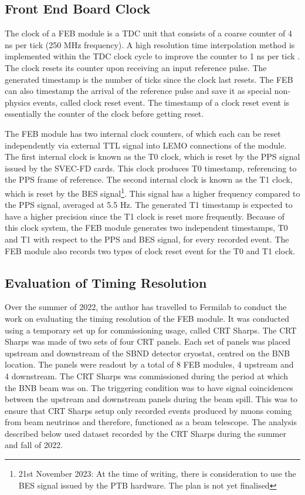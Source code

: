 
\subsection{Front End Board Clock}

The clock of a FEB module is a TDC unit that consists of a coarse counter of 4 ns per tick (250 MHz frequency). 
A high resolution time interpolation method is implemented within the TDC clock cycle to improve the counter to 1 ns per tick \cite{crt_clock}.
The clock resets its counter upon receiving an input reference pulse.  
The generated timestamp is the number of ticks since the clock last resets.
The FEB can also timestamp the arrival of the reference pulse and save it as special non-physics events, called clock reset event.
The timestamp of a clock reset event is essentially the counter of the clock before getting reset.

The FEB module has two internal clock counters, of which each can be reset independently via external TTL signal into LEMO connections of the module.
The first internal clock is known as the T0 clock, which is reset by the PPS signal issued by the SVEC-FD cards. 
This clock produces T0 timestamp, referencing to the PPS frame of reference.
The second internal clock is known as the T1 clock, which is reset by the BES signal\footnote{21st November 2023: At the time of writing, there is consideration to use the BES signal issued by the PTB hardware. The plan is not yet finalised}.
This signal has a higher frequency compared to the PPS signal, averaged at 5.5 Hz.
The generated T1 timestamp is expected to have a higher precision since the T1 clock is reset more frequently. 
Because of this clock system, the FEB module generates two independent timestamps, T0 and T1 with respect to the PPS and BES signal, for every recorded event.
The FEB module also records two types of clock reset event for the T0 and T1 clock.

\subsection{Evaluation of Timing Resolution}

Over the summer of 2022, the author has travelled to Fermilab to conduct the work on evaluating the timing resolution of the FEB module.
It was conducted using a temporary set up for commissioning usage, called CRT Sharps.
The CRT Sharps was made of two sets of four CRT panels. 
Each set of panels was placed upstream and downstream of the SBND detector cryostat, centred on the BNB location.
The panels were readout by a total of 8 FEB modules, 4 upstream and 4 downstream.
The CRT Sharps was commissioned during the period at which the BNB beam was on. 
The triggering condition was to have signal coincidences between the upstream and downstream panels during the beam spill.
This was to ensure that CRT Sharps setup only recorded events produced by muons coming from beam neutrinos and therefore, functioned as a beam telescope.
The analysis described below used dataset recorded by the CRT Sharps during the summer and fall of 2022.

